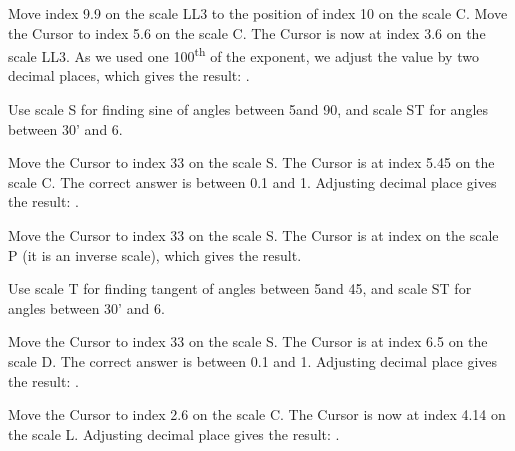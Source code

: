 \begin{multicols*}{3}
{
Move index 9.9 on the scale LL3 to the position of index 10 on the scale C.
Move the Cursor to index 5.6 on the scale C.
The Cursor is now at index 3.6 on the scale LL3.
As we used one 100\textsuperscript{th} of the exponent, we adjust the value by two decimal places, which gives the result: .


\footnotesize Use scale S for finding sine of angles between 5\textdegree and 90\textdegree, and scale ST for angles between 30' and 6\textdegree. \normalsize

Move the Cursor to index 33 on the scale S.
The Cursor is at index 5.45 on the scale C.
The correct answer is between 0.1 and 1. Adjusting decimal place gives the result: .


Move the Cursor to index 33 on the scale S.
The Cursor is at index  on the scale P (it is an inverse scale), which gives the result.


\footnotesize Use scale T for finding tangent of angles between 5\textdegree and 45\textdegree, and scale ST for angles between 30' and 6\textdegree. \normalsize

Move the Cursor to index 33 on the scale S.
The Cursor is at index 6.5 on the scale D.
The correct answer is between 0.1 and 1. Adjusting decimal place gives the result: .


Move the Cursor to index 2.6 on the scale C.
The Cursor is now at index 4.14 on the scale L.
Adjusting decimal place gives the result: .
  }
  \end{multicols*}
  

